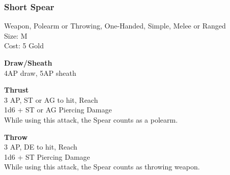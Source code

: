 \subsubsection{Short Spear}\label{weapon:shortSpear}
Weapon, Polearm or Throwing, One-Handed, Simple, Melee or Ranged\\
Size: M\\
Cost: 5 Gold

\textbf{Draw/Sheath}\\
4AP draw, 5AP sheath

\textbf{Thrust}\\
3 AP, ST or AG to hit,  Reach\\
1d6 + \texttimes ST or AG Piercing Damage\\
While using this attack, the Spear counts as a polearm.

\textbf{Throw}\\
3 AP, DE to hit,  Reach\\
1d6 + \texttimes ST Piercing Damage\\
While using this attack, the Spear counts as throwing weapon.

